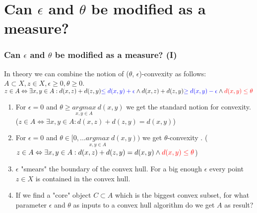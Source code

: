 \documentclass[
    11pt, %
    aspectratio=169, %
    handout
]{beamer}
\begin{document}
\section{Can $\epsilon$ and $\theta$ be modified as a measure?}
\begin{frame}
\frametitle{Can $\epsilon$ and $\theta$ be modified as a measure? (I)}
In theory we can combine the notion of ($\theta$, $\epsilon$)-convexity as follows:
$A \subset X, z \in X, \epsilon \geq 0, \theta \geq 0$. \\
$z \in A \Leftrightarrow \exists x,y \in A: d(x,z)+d(z,y) \textcolor{blue}{\leq d(x,y) + \epsilon} \land d(x,z)+d(z,y) \textcolor{blue}{\geq d(x,y) - \epsilon} \land \textcolor{red}{d(x,y) \leq \theta}$
\begin{enumerate}
\item<2-> For $\epsilon=0$ and $\theta \geq \underset{x,y \in A}{argmax}~ d(x,y)$ we get the standard notion for convexity. {\tiny ($z \in A \Leftrightarrow \exists x,y \in A: d(x,z)+d(z,y)=d(x,y)$)}
\item<3-> For $\epsilon=0$ and $\theta \in [0, ... \underset{x,y \in A}{argmax}~ d(x,y))$ we get $\theta$-convexity \cite{Lab2324BigData/Main}. {\tiny ($z \in A \Leftrightarrow \exists x,y \in A: d(x,z)+d(z,y)=d(x,y) \land \textcolor{red}{d(x,y) \leq \theta}$)}
\item<4-> $\epsilon$ "smears" the boundary of the convex hull. For a big enough $\epsilon$ every point $z \in X$ is contained in the convex hull.
\item<5-> If we find a "core" object $C \subset A$ which is the biggest convex subset, for what parameter $\epsilon$ and $\theta$ as inputs to a convex hull algorithm do we get $A$ as result? 
\end{enumerate}
\end{frame}
\end{document}
